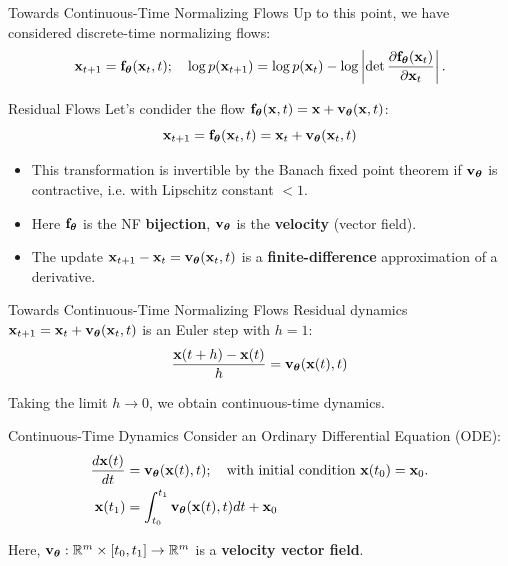 \documentclass{beamer}
\renewcommand{\eqpause}{}
\renewcommand{\nextonslide}[1]{#1}
\begin{document}
\begin{frame}{Towards Continuous-Time Normalizing Flows}
	Up to this point, we have considered discrete-time normalizing flows:
	\vspace{-0.3cm}
	\[
		\mathbf{x}_{t+1} = \mathbf{f}_{\boldsymbol{\theta}}(\mathbf{x}_t, t); \quad \log p(\mathbf{x}_{t+1}) = \log p(\mathbf{x}_{t}) - \log \left| \det \frac{\partial \mathbf{f}_{\boldsymbol{\theta}}(\mathbf{x}_t)}{\partial \mathbf{x}_{t}} \right| .
	\]
	\vspace{-0.3cm}
	\eqpause
	\begin{block}{Residual Flows}
		Let's condider the flow $\mathbf{f}_{\boldsymbol{\theta}}(\mathbf{x}, t) = \mathbf{x} + \mathbf{v}_{\boldsymbol{\theta}}(\mathbf{x}, t)$:
		\[
			\mathbf{x}_{t+1} = \mathbf{f}_{\boldsymbol{\theta}}(\mathbf{x}_t, t) = \mathbf{x}_t + \mathbf{v}_{\boldsymbol{\theta}}(\mathbf{x}_t, t)
		\]
		\eqpause
		\vspace{-0.5cm}
		\begin{itemize}
			\item This transformation is invertible by the Banach fixed point theorem if $\mathbf{v}_{\boldsymbol{\theta}}$ is contractive, i.e. with Lipschitz constant $<1$.
			\item Here $\mathbf{f}_{\boldsymbol{\theta}}$ is the NF \textbf{bijection}, $\mathbf{v}_{\boldsymbol{\theta}}$ is the \textbf{velocity} (vector field).
			\item The update $\mathbf{x}_{t+1} - \mathbf{x}_t = \mathbf{v}_{\boldsymbol{\theta}}(\mathbf{x}_t, t)$ is a \textbf{finite-difference} approximation of a derivative.
		\end{itemize}
	\end{block}
\end{frame}
\begin{frame}{Towards Continuous-Time Normalizing Flows}
	Residual dynamics $\mathbf{x}_{t+1} = \mathbf{x}_t + \mathbf{v}_{\boldsymbol{\theta}}(\mathbf{x}_t, t)$ is an Euler step with $h=1$:
	\[
		\frac{\mathbf{x}(t + h) - \mathbf{x}(t)}{h} = \mathbf{v}_{\boldsymbol{\theta}}(\mathbf{x}(t), t)
	\]
	\eqpause
	Taking the limit $h \rightarrow 0$, we obtain continuous-time dynamics.
	\begin{block}{Continuous-Time Dynamics}
		Consider an Ordinary Differential Equation (ODE):
		\vspace{-0.3cm}
		\begin{align*}
		   \frac{d \bx(t)}{dt} &= \bv_{\btheta}(\bx(t), t); \quad \text{with initial condition }\bx(t_0) = \bx_0. \\
		   \nextonslide{
		   \bx(t_1) &= \int^{t_1}_{t_0} \bv_{\btheta}(\bx(t), t) d t  + \bx_0
		   }
		\end{align*}
		\vspace{-0.6cm}
	\end{block}
	Here, $\mathbf{v}_{\boldsymbol{\theta}}: \mathbb{R}^m \times [t_0, t_1] \rightarrow \mathbb{R}^m$ is a \textbf{velocity vector field}.
\end{frame}
\end{document}
